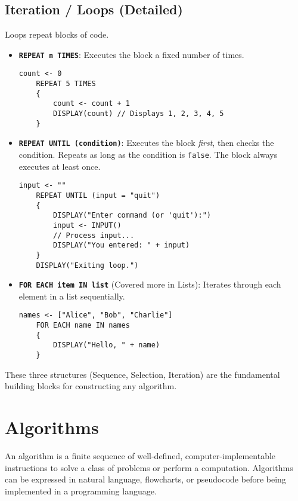 \documentclass[11pt,oneside]{book}
\begin{document}
\subsection*{Iteration / Loops (Detailed)}
Loops repeat blocks of code.
\begin{itemize}
    \item \textbf{\texttt{REPEAT n TIMES}}: Executes the block a fixed number of times.\\[1ex]
    \begin{lstlisting}[language={}, label={lst:repeat_n_detail}, caption={AP Pseudocode: REPEAT n TIMES}]
    count <- 0
    REPEAT 5 TIMES
    {
        count <- count + 1
        DISPLAY(count) // Displays 1, 2, 3, 4, 5
    }
    \end{lstlisting}
    \item \textbf{\texttt{REPEAT UNTIL (condition)}}: Executes the block \textit{first}, then checks the condition. Repeats as long as the condition is \texttt{false}. The block always executes at least once.\\[1ex]
    \begin{lstlisting}[language={}, label={lst:repeat_until_detail}, caption={AP Pseudocode: REPEAT UNTIL}]
    input <- ""
    REPEAT UNTIL (input = "quit")
    {
        DISPLAY("Enter command (or 'quit'):")
        input <- INPUT()
        // Process input...
        DISPLAY("You entered: " + input)
    }
    DISPLAY("Exiting loop.")
    \end{lstlisting}
    \item \textbf{\texttt{FOR EACH item IN list}} (Covered more in Lists): Iterates through each element in a list sequentially.\\[1ex]
    \begin{lstlisting}[language={}, label={lst:for_each_detail}, caption={AP Pseudocode: FOR EACH}]
    names <- ["Alice", "Bob", "Charlie"]
    FOR EACH name IN names
    {
        DISPLAY("Hello, " + name)
    }
    \end{lstlisting}
\end{itemize}
These three structures (Sequence, Selection, Iteration) are the fundamental building blocks for constructing any algorithm.

\section{Algorithms}
\label{sec:algorithms}
An algorithm is a finite sequence of well-defined, computer-implementable instructions to solve a class of problems or perform a computation.
Algorithms can be expressed in natural language, flowcharts, or pseudocode before being implemented in a programming language.
\end{document}
